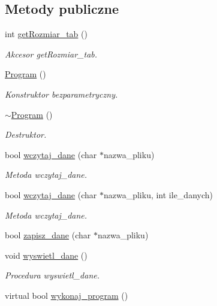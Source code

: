 \subsection*{Metody publiczne}
\begin{DoxyCompactItemize}
\item 
int \hyperlink{class_program_a4fb9c2979a0dca1e14c75f4cc461bebd}{get\-Rozmiar\-\_\-tab} ()
\begin{DoxyCompactList}\small\item\em Akcesor get\-Rozmiar\-\_\-tab. \end{DoxyCompactList}\item 
\hyperlink{class_program_aaefaa0df08f3484476fc4d61e97acbdc}{Program} ()
\begin{DoxyCompactList}\small\item\em Konstruktor bezparametryczny. \end{DoxyCompactList}\item 
\hyperlink{class_program_a986aef1c50e1d338a3315a47ba6df549}{$\sim$\-Program} ()
\begin{DoxyCompactList}\small\item\em Destruktor. \end{DoxyCompactList}\item 
bool \hyperlink{class_program_a618d9d6e3255ca5ff3d65de0385c6d46}{wczytaj\-\_\-dane} (char $\ast$nazwa\-\_\-pliku)
\begin{DoxyCompactList}\small\item\em Metoda wczytaj\-\_\-dane. \end{DoxyCompactList}\item 
bool \hyperlink{class_program_a6bfc0c61a365d212dbb73e95034185c1}{wczytaj\-\_\-dane} (char $\ast$nazwa\-\_\-pliku, int ile\-\_\-danych)
\begin{DoxyCompactList}\small\item\em Metoda wczytaj\-\_\-dane. \end{DoxyCompactList}\item 
bool \hyperlink{class_program_a0a0d555a69e791820a70000375462e32}{zapisz\-\_\-dane} (char $\ast$nazwa\-\_\-pliku)
\item 
void \hyperlink{class_program_ac939bc41859b867dd631163f6540573f}{wyswietl\-\_\-dane} ()
\begin{DoxyCompactList}\small\item\em Procedura wyswietl\-\_\-dane. \end{DoxyCompactList}\item 
virtual bool \hyperlink{class_program_ac396401ba5cade863d0e6acb727bec4e}{wykonaj\-\_\-program} ()

\end{DoxyCompactItemize}
